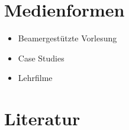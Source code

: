 \hypertarget{medienformenpathlabel....srcmodulbeschreibungen-bachelor-bpo5ba_mensch-computer_interaktion}{%
\section*{Medienformen\label{../../src/modulbeschreibungen-bachelor-bpo5/BA_Mensch-Computer_Interaktion}}\label{medienformenpathlabel....srcmodulbeschreibungen-bachelor-bpo5ba_mensch-computer_interaktion}}

\begin{itemize}
\tightlist
\item
  Beamergestützte Vorlesung
\item
  Case Studies
\item
  Lehrfilme
\end{itemize}

\hypertarget{literaturpathlabel....srcmodulbeschreibungen-bachelor-bpo5ba_mensch-computer_interaktion}{%
\section*{Literatur\label{../../src/modulbeschreibungen-bachelor-bpo5/BA_Mensch-Computer_Interaktion}}\label{literaturpathlabel....srcmodulbeschreibungen-bachelor-bpo5ba_mensch-computer_interaktion}}

